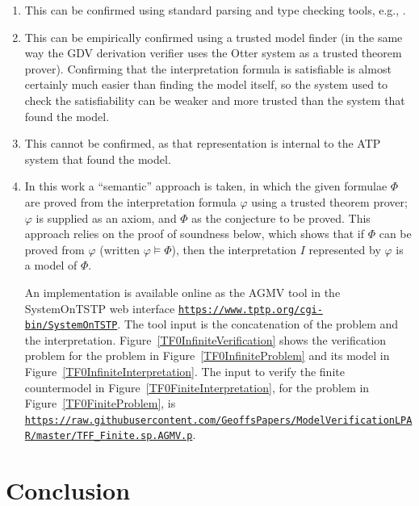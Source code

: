 \documentclass{easychair}
\newcommand{\smalltt}[1]{\small \texttt{#1}}
\begin{document}
\begin{enumerate}
\item This can be confirmed using standard parsing and type checking tools, e.g., \cite{VS06,HR15}.
\item This can be empirically confirmed using a trusted model finder (in the same way the GDV 
      derivation verifier \cite{Sut06} uses the Otter system \cite{McC03-Otter} as a trusted 
      theorem prover).
      Confirming that the interpretation formula is satisfiable is almost certainly much 
      easier than finding the model itself, so the system used to check the satisfiability can 
      be weaker and more trusted than the system that found the model.
\item This cannot be confirmed, as that representation is internal to the ATP system that found
      the model.
\item In this work a ``semantic'' approach is taken, in which the given formulae $\Phi$ are proved 
      from the interpretation formula $\varphi$ using a trusted theorem prover; $\varphi$ is 
      supplied as an axiom, and $\Phi$ as the conjecture to be proved.
      This approach relies on the proof of soundness below, which shows that if $\Phi$ can be 
      proved from $\varphi$ (written $\varphi \models \Phi$), then the interpretation $I$ 
      represented by $\varphi$ is a model of $\Phi$.

      An implementation is available online as the AGMV tool in the SystemOnTSTP \cite{Sut07-CSR} 
      web interface {\smalltt{\url{https://www.tptp.org/cgi-bin/SystemOnTSTP}}}.
      The tool input is the concatenation of the problem and the interpretation.
      Figure~\ref{TF0InfiniteVerification} shows the verification problem for the problem in 
      Figure~\ref{TF0InfiniteProblem} and its model in Figure~\ref{TF0InfiniteInterpretation}.
      The input to verify the finite countermodel in Figure~\ref{TF0FiniteInterpretation}, for the 
      problem in Figure~\ref{TF0FiniteProblem}, is
      {\smalltt{\url{https://raw.githubusercontent.com/GeoffsPapers/ModelVerificationLPAR/master/TFF_Finite.sp.AGMV.p}}}.
\end{enumerate}

\section{Conclusion}
\label{Conclusion}
\end{document}

